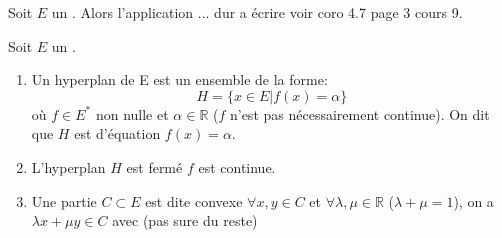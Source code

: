 \documentclass[12pt,a4paper]{article}
\begin{document}
\begin{flushleft}
\begin{cor}
Soit $E$ un \evn . Alors l'application ... dur a écrire voir coro 4.7 page 3 cours 9.
\end{cor}

\begin{mydef}
Soit $E$ un \evn . 
\begin{enumerate}
\item Un hyperplan de E est un ensemble de la forme: $$ H = \{ x \in E | f(x) = \alpha \}$$ où $f \in E^*$ non nulle et $\alpha \in \mathbb{R}$ ($f$ n'est pas nécessairement continue). On dit que $H$ est d'équation $f(x) = \alpha$.
\item L'hyperplan $H$ est fermé \ssi $f$ est continue.
\item Une partie $C \subset E$ est dite convexe \ssi $\forall x, y \in C$ et $\forall \lambda , \mu \in \mathbb{R}$ ($\lambda + \mu = 1$), on a $\lambda x + \mu y \in C$ avec (pas sure du reste)
\end{enumerate}
\end{mydef}












































\end{flushleft}
\end{document}
